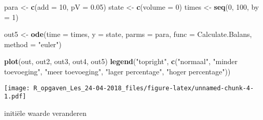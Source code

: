 \documentclass[]{article}
\newenvironment{Shaded}{\begin{snugshade}}{\end{snugshade}}
\newcommand{\KeywordTok}[1]{\textcolor[rgb]{0.13,0.29,0.53}{\textbf{#1}}}
\newcommand{\DataTypeTok}[1]{\textcolor[rgb]{0.13,0.29,0.53}{#1}}
\newcommand{\DecValTok}[1]{\textcolor[rgb]{0.00,0.00,0.81}{#1}}
\newcommand{\FloatTok}[1]{\textcolor[rgb]{0.00,0.00,0.81}{#1}}
\newcommand{\StringTok}[1]{\textcolor[rgb]{0.31,0.60,0.02}{#1}}
\newcommand{\NormalTok}[1]{#1}
\begin{document}
\begin{Shaded}
\begin{Highlighting}[]
\NormalTok{para <-}\StringTok{ }\KeywordTok{c}\NormalTok{(}\DataTypeTok{add =} \DecValTok{10}\NormalTok{, }\DataTypeTok{pV =} \FloatTok{0.05}\NormalTok{)}
\NormalTok{state <-}\StringTok{ }\KeywordTok{c}\NormalTok{(}\DataTypeTok{volume =} \DecValTok{0}\NormalTok{)}
\NormalTok{times <-}\StringTok{ }\KeywordTok{seq}\NormalTok{(}\DecValTok{0}\NormalTok{, }\DecValTok{100}\NormalTok{,  }\DataTypeTok{by =} \DecValTok{1}\NormalTok{)}

\NormalTok{out5 <-}\StringTok{ }\KeywordTok{ode}\NormalTok{(}\DataTypeTok{time =}\NormalTok{ times,}
           \DataTypeTok{y =}\NormalTok{ state,}
           \DataTypeTok{parms =}\NormalTok{ para,}
           \DataTypeTok{func =}\NormalTok{ Calculate.Balans,}
           \DataTypeTok{method =} \StringTok{"euler"}\NormalTok{)}
\end{Highlighting}
\end{Shaded}

\begin{Shaded}
\begin{Highlighting}[]
\KeywordTok{plot}\NormalTok{(out, out2, out3, out4, out5)}
\KeywordTok{legend}\NormalTok{(}\StringTok{"topright"}\NormalTok{,}
       \KeywordTok{c}\NormalTok{(}\StringTok{"normaal"}\NormalTok{, }\StringTok{"minder toevoeging"}\NormalTok{, }
         \StringTok{"meer toevoeging"}\NormalTok{, }\StringTok{"lager percentage"}\NormalTok{, }\StringTok{"hoger percentage"}\NormalTok{))}
\end{Highlighting}
\end{Shaded}

\texttt{[image: R\_opgaven\_Les\_24-04-2018\_files/figure-latex/unnamed-chunk-4-1.pdf]}

initiële waarde veranderen
\end{document}
